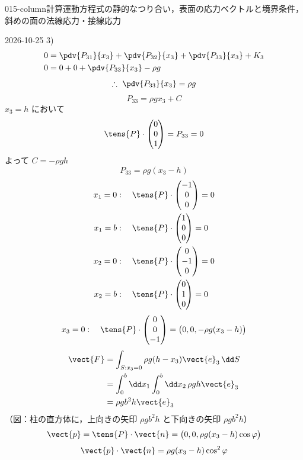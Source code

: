 \documentclass[uplatex,dvipdfmx,a4paper,11pt]{jsarticle}
\begin{document}
\begin{mondai}{015-column}{計算}{運動方程式の静的なつり合い，表面の応力ベクトルと境界条件，斜めの面の法線応力・接線応力}
\begin{kotaeutsushi}{2026-10-25}
3)
\begin{align*}
0&=\pdv{P_{31}}{x_{3}}+\pdv{P_{32}}{x_{3}}+\pdv{P_{33}}{x_{3}}+K_{3}\\
0&=0+0+\pdv{P_{33}}{x_{3}}-\rho g
\end{align*}
\[ \therefore\ \pdv{P_{33}}{x_{3}}=\rho g \]
\[ P_{33}=\rho gx_{3}+C \]
$x_{3}=h$ において
\[ \tens{P}\cdot\begin{pmatrix}0\\0\\1\end{pmatrix}=P_{33}=0 \]
よって $C=-\rho gh$
\[ P_{33}=\rho g(x_{3}-h) \]
\begin{align*}
x_{1}=0&:\quad\tens{P}\cdot\begin{pmatrix}-1\\0\\0\end{pmatrix}=0\\
x_{1}=b&:\quad\tens{P}\cdot\begin{pmatrix}1\\0\\0\end{pmatrix}=0\\
x_{2}=0&:\quad\tens{P}\cdot\begin{pmatrix}0\\-1\\0\end{pmatrix}=0\\
x_{2}=b&:\quad\tens{P}\cdot\begin{pmatrix}0\\1\\0\end{pmatrix}=0
\end{align*}
\[ x_{3}=0:\quad\tens{P}\cdot\begin{pmatrix}0\\0\\-1\end{pmatrix}=\bigl(0,0,-\rho g(x_{3}-h)\bigr) \]
\begin{align*}
\vect{F}&=\int_{S:x_{3}=0}\rho g(h-x_{3})\vect{e}_{3}\,\dd S\\
&=\int_{0}^{b}\dd x_{1}\int_{0}^{b}\dd x_{2}\,\rho gh\vect{e}_{3}\\
&=\rho gb^{2}h\vect{e}_{3}
\end{align*}
（図：柱の直方体に，上向きの矢印 $\rho gb^{2}h$ と下向きの矢印 $\rho gb^{2}h$）
\[ \vect{p}=\tens{P}\cdot\vect{n}=\bigl(0,0,\rho g(x_{3}-h)\cos\varphi\bigr) \]
\[ \vect{p}\cdot\vect{n}=\rho g(x_{3}-h)\cos^{2}\varphi \]

\end{kotaeutsushi}
\end{mondai}
\end{document}
